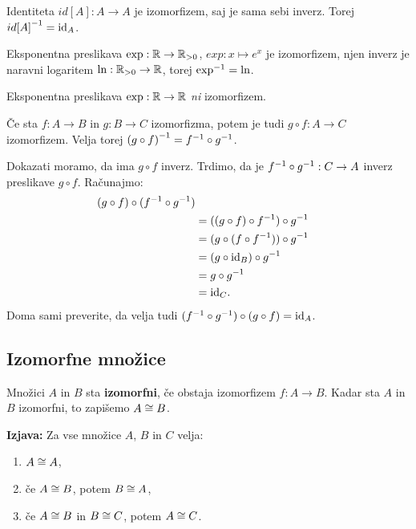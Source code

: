 \begin{primer}
  Identiteta $id[A] : A \to A$ je izomorfizem, saj je sama sebi inverz.
  Torej $\inv{id[A]} = \id[A]$.
\end{primer}

\begin{primer}
  Eksponentna preslikava $\exp : \RR \to \RR_{> 0}$, $exp : x \mapsto e^x$ je
  izomorfizem, njen inverz je naravni logaritem $\ln : \RR_{> 0} \to \RR$, torej $\inv{\exp} = \ln$.
\end{primer}

\begin{primer}
  Eksponentna preslikava $\exp : \RR \to \RR$ \emph{ni} izomorfizem.
\end{primer}

\begin{izjava}
  Če sta $f : A \to B$ in $g : B \to C$ izomorfizma, potem je tudi $g \circ f : A \to C$ izomorfizem. Velja torej $\inv{(g \circ f)} = \inv{f} \circ \inv{g}$.
\end{izjava}

\begin{dokaz}
  Dokazati moramo, da ima $g \circ f$ inverz. Trdimo, da je $\inv{f} \circ \inv{g} : C \to A$ inverz preslikave $g \circ f$. Računajmo:
  \begin{align*}
    (g \circ f) \circ (\inv{f} \circ \inv{g}) \\
     &= ((g \circ f) \circ \inv{f}) \circ \inv{g} \\
     &= (g \circ (f \circ \inv{f})) \circ \inv{g} \\
     &= (g \circ \id[B]) \circ \inv{g} \\
     &= g \circ \inv{g} \\
     &= \id[C].
  \end{align*}
  Doma sami preverite, da velja tudi $(\inv{f} \circ \inv{g}) \circ (g \circ f) = \id[A]$.
\end{dokaz}

\subsection{Izomorfne množice}


\begin{definicija}
  Množici $A$ in $B$ sta \textbf{izomorfni}, če obstaja izomorfizem $f : A \to B$. Kadar sta $A$ in $B$ izomorfni, to zapišemo $A \iso B$.
\end{definicija}

\begin{izjava}
  \textbf{Izjava:} Za vse množice $A$, $B$ in $C$ velja:
  \begin{enumerate}
    \item $A \iso A$,
    \item če $A \iso B$, potem $B \iso A$,
    \item če $A \iso B$ in $B \iso C$, potem $A \iso C$.
  \end{enumerate}
\end{izjava}


